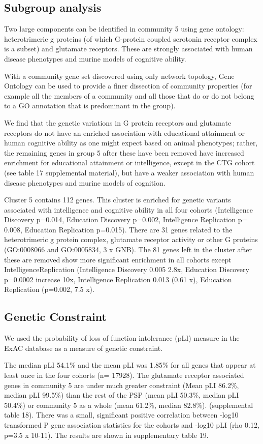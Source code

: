 \subsection{Subgroup analysis}
Two large components can be identified in community 5 using gene ontology: heterotrimeric g proteins (of which G-protein coupled serotonin receptor complex is a subset) and glutamate receptors. These are strongly associated with human disease phenotypes and murine models of cognitive ability.

With a community gene set discovered using only network topology, Gene Ontology can be used to provide a finer dissection of community properties (for example all the members of a community and all those that do or do not belong to a GO annotation that is predominant in the group).

We find that the genetic variations in G protein receptors and glutamate receptors do not have an enriched association with educational attainment or human cognitive ability as one might expect based on animal phenotypes; rather, the remaining genes in group 5 after these have been removed have increased enrichment for educational attainment or intelligence, except in the CTG cohort (see table 17 supplemental material), but have a weaker association with human disease phenotypes and murine models of cognition. 

Cluster 5 contains 112 genes. This cluster is enriched for genetic variants associated with intelligence and cognitive ability in all four cohorts (Intelligence Discovery p=0.014, Education Discovery p=0.002, Intelligence Replication p= 0.008, Education Replication p=0.015). There are 31 genes related to the heterotrimeric g protein complex, glutamate receptor activity or other G proteins (GO:0008066 and GO:0005834, 3 x GNB). The 81 genes left in the cluster after these are removed show more significant enrichment in all cohorts except IntelligenceReplication  (Intelligence Discovery 0.005 2.8x, Education Discovery p=0.0002 increase 10x, Intelligence Replication 0.013 (0.61 x), Education Replication (p=0.002, 7.5 x).
 
\subsection{Genetic Constraint}
We used the probability of loss of function intolerance (pLI) measure in the ExAC database as a measure of genetic constraint. \cite{lek2016analysis} 

The median pLI 54.1\% and the mean pLI was 1.85\% for all genes that appear at least once in the four cohorts (n= 17928). The glutamate receptor associated genes in community 5 are under much greater constraint (Mean pLI 86.2\%, median pLI 99.5\%) than the rest of the PSP (mean pLI 50.3\%, median pLI 50.4\%) or community 5 as a whole (mean 61.2\%, median 82.8\%).
(supplemental table 18). 
There was a small, significant positive correlation between -log10 transformed P 
gene association statistics for the cohorts and -log10 pLI (rho 0.12, p=3.5 x 10-11). The results are shown in supplementary table 19.

